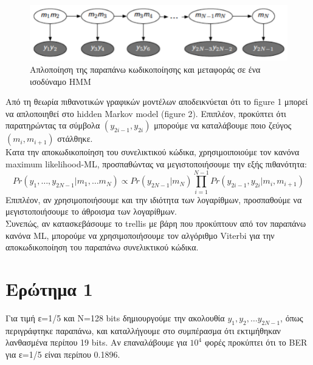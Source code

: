 \documentclass{article}
\begin{document}
\begin{figure}[h]
	\centering
	\includegraphics[width=0.6\linewidth]{./results/BSC_coding1.png}
	\caption{Απλοποίηση της παραπάνω κωδικοποίησης και μεταφοράς σε ένα ισοδύναμο HMM }
\end{figure}

\noindent
Από τη θεωρία πιθανοτικών γραφικών μοντέλων αποδεικνύεται ότι το figure 1 μπορεί να απλοποιηθεί στο hidden Markov model (figure 2). Επιπλέον, προκύπτει ότι παρατηρώντας τα σύμβολα $(y_{2i-1},y_{2i})$ μπορούμε να καταλάβουμε ποιο ζεύγος $(m_{i},m_{i+1})$ στάλθηκε.\\

\noindent
Κατα την αποκωδικοποίηση του συνελικτικού κώδικα, χρησιμοιποιούμε τον κανόνα maximum likelihood-ML, προσπαθώντας να μεγιστοποιήσουμε την εξής πιθανότητα:
$$Pr(y_{1},\dots,y_{2N-1}|m_{1},\dots m_{N}) \propto Pr(y_{2N-1}|m_{N})\prod_{i=1}^{N-1} Pr(y_{2i-1},y_{2i}|m_{i},m_{i+1})$$
Επιπλέον, αν χρησιμοποιήσουμε και την ιδιότητα των λογαρίθμων, προσπαθούμε να μεγιστοποιήσουμε το άθροισμα των λογαρίθμων. \\
Συνεπώς, αν κατασκεβάσουμε το trellis με βάρη που προκύπτουν από τον παραπάνω κανόνα ML, μπορούμε  να χρησιμοποιήσουμε τον αλγόριθμο Viterbi για την αποκωδικοποίηση του παραπάνω συνελικτικού κώδικα.

\pagebreak
\section{Eρώτημα 1}
Για τιμή ε=1/5 και Ν=128 bits δημιουργούμε την ακολουθία $y_{1}, y_{2}, \dots y_{2N-1}$, όπως περιγράφτηκε παραπάνω, και καταλλήγουμε στο συμπέρασμα ότι εκτιμήθηκαν λανθασμένα περίπου 19 bits. Aν επαναλάβουμε για $10^4$ φορές προκύπτει ότι το BER για ε=1/5 είναι περίπου 0.1896.\\
\end{document}
